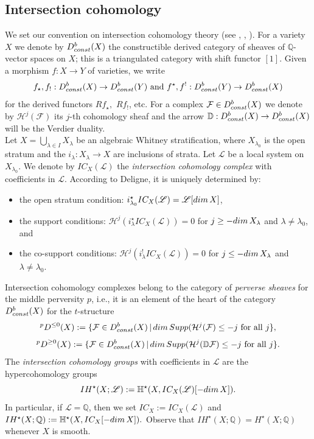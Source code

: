 \documentclass[11pt, reqno]{amsart}
\theoremstyle{plain}
\theoremstyle{definition}
\theoremstyle{remark}
\begin{document}
\subsection{Intersection cohomology}
We set our convention on intersection cohomology theory (see \cite{BBD82,  GM83, CM09}, \cite[Section 1]{Wil17}, \cite{Max19}). For a variety $X$
we denote by $D_{\rm const}^{b}(X)$ the constructible derived category of sheaves of $\mathbb{Q}$-vector spaces on $X$;
this is a triangulated category with shift functor $[1]$. Given a morphism $f: X\rightarrow Y$ of varieties, we write  
$$ f_{\star}, f_{!}: D_{\rm const}^{b}(X)\rightarrow D_{\rm const}^{b}(Y)\text{ and }  f^{\star}, f^{!}: D_{\rm const}^{b}(Y)\rightarrow D_{\rm const}^{b}(X)$$
for the derived functors $Rf_{\star},$ $Rf_{!}$, etc. For a complex $\mathcal{F}\in D_{\rm const}^{b}(X)$ we denote
by $\mathcal{H}^{j}(\mathcal{F})$ its $j$-th cohomology sheaf and the arrow
$\mathbb{D}: D_{\rm const}^{b}(X)\rightarrow D_{\rm const}^{b}(X)$
will be the Verdier duality. 
\\

Let
$X =  \bigcup_{\lambda\in I} X_{\lambda}$
be  an algebraic Whitney stratification,
where $X_{\lambda_{0}}$ is the open stratum and the $i_{\lambda}: X_{\lambda}\rightarrow X$ are inclusions of strata.
Let $\mathscr{L}$ be a local system on $X_{\lambda_{0}}$. We denote by $IC_{X}(\mathscr{L})$ the \emph{intersection cohomology complex} with coefficients in $\mathscr{L}$. According to Deligne, it is uniquely determined by:
\begin{itemize}
\item[(1)] the open stratum condition: $i_{\lambda_{0}}^{\star} IC_{X}(\mathscr{L}) =  \mathscr{L}[{\rm dim}\, X]$,
\item[(2)] the support conditions: $\mathcal{H}^{j}(i_{\lambda}^{\star} IC_{X}(\mathscr{L})) =  0$ for $j\geq -{\rm dim}\, X_{\lambda}$
and $\lambda\neq \lambda_{0}$, and
\item[(3)] the co-support conditions: $\mathcal{H}^{j}(i_{\lambda}^{!} IC_{X}(\mathscr{L})) =  0$ for $j \leq -{\rm dim}\, X_{\lambda}$
and $\lambda \neq \lambda_{0}$. 
\end{itemize}
Intersection cohomology complexes belong to the category of \emph{perverse sheaves} for the middle perversity $p$, i.e.,
it is an element of the heart of the category $D_{\rm const}^{b}(X)$ for the $t$-structure
$${}^{p}D^{\leq 0}(X) :=  \{ \mathcal{F}\in D_{\rm const}^{b}(X)\,|\, {\rm dim}\, {\rm Supp}(\mathcal{H}^{j}(\mathcal{F})\leq -j\text{ for all } j\}, $$
$${}^{p}D^{\geq 0}(X) :=  \{ \mathcal{F}\in D_{\rm const}^{b}(X)\,|\, {\rm dim}\, {\rm Supp}(\mathcal{H}^{j}(\mathbb{D}\mathcal{F})\leq -j\text{ for all } j\}.$$
The \emph{intersection cohomology groups} with coefficients in $\mathscr{L}$ are the hypercohomology groups 
$$ IH^{\star}(X; \mathscr{L}):= \mathbb{H}^{\star}(X, IC_{X}(\mathscr{L})[-{\rm dim}\, X]).$$
In particular, if $\mathscr{L} =  \mathbb{Q}$, then we set $IC_{X}:= IC_{X}(\mathscr{L})$ and $IH^{\star}(X; \mathbb{Q}):=\mathbb{H}^{\star}(X, IC_{X}[-{\rm dim}\, X]).$
Observe 
 that $IH^{\star}(X; \mathbb{Q}) =  H^{\star}(X; \mathbb{Q})$ whenever $X$ is smooth.
\end{document}
